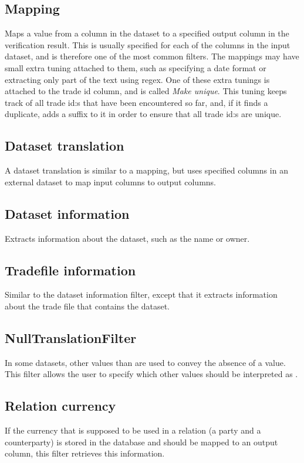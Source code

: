 \subsection{Mapping}
Maps a value from a column in the dataset to a specified output column in the verification result. This is usually specified for each of the columns in the input
dataset, and is therefore one of the most common filters. The mappings may have small extra tuning attached to them, such as specifying a date format or extracting only part of the
text using regex. One of these extra tunings is attached to the trade id column, and is called \textit{Make unique}. This tuning keeps track of all trade id:s that
have been encountered so far, and, if it finds a duplicate, adds a suffix to it in order to ensure that all trade id:s are unique.

\subsection{Dataset translation}
A dataset translation is similar to a mapping, but uses specified columns in an external dataset to map input columns to output columns.

\subsection{Dataset information}
Extracts information about the dataset, such as the name or owner.

\subsection{Tradefile information}
Similar to the dataset information filter, except that it extracts information about the trade file that contains the dataset.

\subsection{NullTranslationFilter}
In some datasets, other values than  are used to convey the absence of a value. This filter allows the user to specify which other values
should be interpreted as .

\subsection{Relation currency}
If the currency that is supposed to be used in a relation (a party and a counterparty) is stored in the database and should be mapped to an output column, this
filter retrieves this information.

